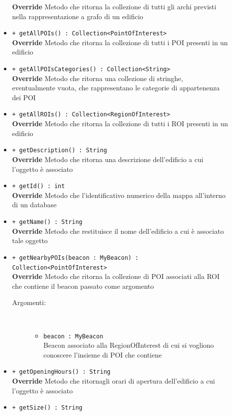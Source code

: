 \documentclass[../DefinizioneDiProdotto.tex]{subfiles}
\begin{document}
\begin{description}
\begin{itemize}
		\textbf{Override} Metodo che ritorna la collezione di tutti gli archi previsti nella rappresentazione a grafo di un edificio
		\item \texttt{+ getAllPOIs() : Collection<PointOfInterest>}\\
		\textbf{Override} Metodo che ritorna la collezione di tutti i POI presenti in un edificio
		\item \texttt{+ getAllPOIsCategories() : Collection<String>}\\
		\textbf{Override} Metodo che ritorna una collezione di stringhe, eventualmente vuota, che rappresentano le categorie di appartenenza dei POI
		\item \texttt{+ getAllROIs() : Collection<RegionOfInterest>}\\
		\textbf{Override} Metodo che ritorna la collezione di tutti i ROI presenti in un edificio
		\item \texttt{+ getDescription() : String}\\
		\textbf{Override} Metodo che ritorna una descrizione dell'edificio a cui l'oggetto è associato
		\item \texttt{+ getId() : int}\\
		\textbf{Override} Metodo che l'identificativo numerico della mappa all'interno di un database
		\item \texttt{+ getName() : String}\\
		\textbf{Override} Metodo che restituisce il nome dell'edificio a cui è associato tale oggetto
		\item \texttt{+ getNearbyPOIs(beacon : MyBeacon) : Collection<PointOfInterest>}\\
		\textbf{Override} Metodo che ritorna la collezione di POI associati alla ROI che contiene il beacon passato come argomento
		\begin{description}
			\item[Argomenti:] \
			\begin{itemize}
				\item \texttt{beacon : MyBeacon}\\
				Beacon associato alla RegionOfInterest di cui si vogliono conoscere l'insieme di POI che contiene\end{itemize}
		\end{description}
		\item \texttt{+ getOpeningHours() : String}\\
		\textbf{Override} Metodo che ritornagli orari di apertura dell'edificio a cui l'oggetto è associato
		\item \texttt{+ getSize() : String}\\

\end{itemize}
\end{description}
\end{document}
